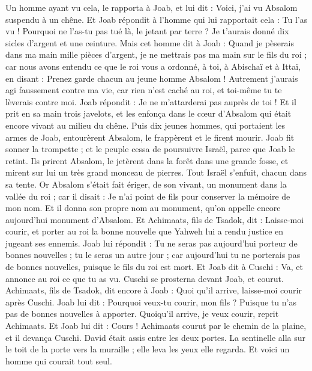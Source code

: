 \begin{multicols}{2}
Un homme ayant vu cela, le rapporta à Joab, et lui dit : Voici, j'ai vu Absalom suspendu à un chêne.
Et Joab répondit à l'homme qui lui rapportait cela : Tu l'as vu ! Pourquoi ne l'as-tu pas tué là, le jetant par terre ? Je t'aurais donné dix sicles d'argent et une ceinture.
Mais cet homme dit à Joab : Quand je pèserais dans ma main mille pièces d'argent, je ne mettrais pas ma main sur le fils du roi ; car nous avons entendu ce que le roi vous a ordonné, à toi, à Abischaï et à Ittaï, en disant : Prenez garde chacun au jeune homme Absalom !
Autrement j’aurais agi faussement contre ma vie, car rien n’est caché au roi, et toi-même tu te lèverais contre moi.
Joab répondit : Je ne m'attarderai pas auprès de toi ! Et il prit en sa main trois javelots, et les enfonça dans le cœur d'Absalom qui était encore vivant au milieu du chêne.
Puis dix jeunes hommes, qui portaient les armes de Joab, entourèrent Absalom, le frappèrent et le firent mourir.
Joab fit sonner la trompette ; et le peuple cessa de poursuivre Israël, parce que Joab le retint.
Ils prirent Absalom, le jetèrent dans la forêt dans une grande fosse, et mirent sur lui un très grand monceau de pierres. Tout Israël s'enfuit, chacun dans sa tente.
Or Absalom s'était fait ériger, de son vivant, un monument dans la vallée du roi ; car il disait : Je n'ai point de fils pour conserver la mémoire de mon nom. Et il donna son propre nom au monument, qu'on appelle encore aujourd'hui monument d'Absalom.
Et Achimaats, fils de Tsadok, dit : Laisse-moi courir, et porter au roi la bonne nouvelle que Yahweh lui a rendu justice en jugeant ses ennemis.
Joab lui répondit : Tu ne seras pas aujourd'hui porteur de bonnes nouvelles ; tu le seras un autre jour ; car aujourd'hui tu ne porterais pas de bonnes nouvelles, puisque le fils du roi est mort.
Et Joab dit à Cuschi : Va, et annonce au roi ce que tu as vu. Cuschi se prosterna devant Joab, et courut.
Achimaats, fils de Tsadok, dit encore à Joab : Quoi qu'il arrive, laisse-moi courir après Cuschi. Joab lui dit : Pourquoi veux-tu courir, mon fils ? Puisque tu n'as pas de bonnes nouvelles à apporter.
Quoiqu'il arrive, je veux courir, reprit Achimaats. Et Joab lui dit : Cours ! Achimaats courut par le chemin de la plaine, et il devança Cuschi.
David était assis entre les deux portes. La sentinelle alla sur le toit de la porte vers la muraille ; elle leva les yeux elle regarda. Et voici un homme qui courait tout seul.

\end{multicols}
